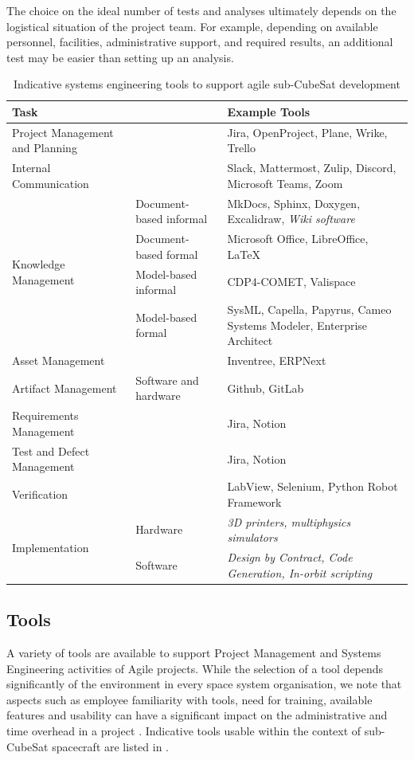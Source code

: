 \documentclass[journal,10pt]{IEEEtran}
\begin{document}
The choice on the ideal number of tests and analyses ultimately depends on the logistical situation of the project team.
	For example, depending on available personnel, facilities, administrative support, and required results, an additional test may be easier than setting up an analysis.


\begin{table}[bth]
	\caption{Indicative systems engineering tools to support agile sub-CubeSat development}
	\label{tab:indicative_tools}
	\begin{tabularx}{\linewidth}{@{}llX@{}}
	\toprule
	\multicolumn{2}{l}{Task} & Example Tools \\ \midrule
	Project Management and Planning &  & Jira, OpenProject, Plane, Wrike, Trello \\
	Internal Communication & & Slack, Mattermost, Zulip, Discord, Microsoft Teams, Zoom \\
	\multirow{4}{*}{Knowledge Management} & Document-based informal & MkDocs, Sphinx, Doxygen, Excalidraw, \textit{Wiki software} \\
	 & Document-based formal & Microsoft Office, LibreOffice, LaTeX \\
	 & Model-based informal & CDP4-COMET, Valispace \\
	 & Model-based formal & SysML, Capella, Papyrus, Cameo Systems Modeler, Enterprise Architect \\
	Asset Management & & Inventree, ERPNext \\
	Artifact Management & Software and hardware & Github, GitLab \\
	Requirements Management &  & Jira, Notion \\
	Test and Defect Management &  & Jira, Notion \\
	Verification &  & LabView, Selenium, Python Robot Framework \\
	\multirow{2}{*}{Implementation} & Hardware & \textit{3D printers, multiphysics simulators} \\
	 & Software & \textit{Design by Contract, Code Generation, In-orbit scripting} \\
	 \bottomrule
	\end{tabularx}
\end{table}

\subsection{Tools}
\label{sec:tools}

A variety of tools are available to support Project Management and Systems Engineering activities of Agile projects. 
While the selection of a tool depends significantly of the environment in every space system organisation, we note that aspects such as employee familiarity with tools, need for training, available features and usability can have a significant impact on the administrative and time overhead in a project \autocite{honore-livermoreDigitalEngineeringDevelopment2022}.
Indicative tools usable within the context of sub-CubeSat spacecraft are listed in .
\end{document}
